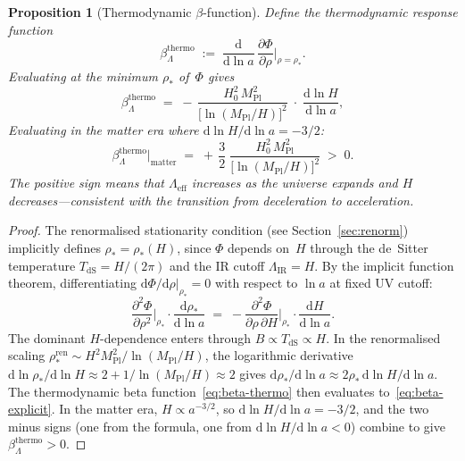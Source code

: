 \documentclass[12pt,a4paper]{article}
\theoremstyle{definition}
\theoremstyle{plain}
\newtheorem{proposition}[definition]{Proposition}
\theoremstyle{remark}
\newcommand{\Leff}{\Lambda_{\mathrm{eff}}}
\newcommand{\LIR}{\Lambda_{\mathrm{IR}}}
\newcommand{\dd}{\mathrm{d}}
\begin{document}
\begin{proposition}[Thermodynamic $\beta$-function]\label{prop:beta-Lambda}
Define the thermodynamic response function
\begin{equation}\label{eq:beta-thermo}
  \beta_\Lambda^{\mathrm{thermo}}
  \;:=\;
  \frac{\dd}{\dd\ln a}\,
  \frac{\partial\Phi}{\partial\rho}\bigg|_{\rho=\rho_\ast}.
\end{equation}
Evaluating at the minimum $\rho_\ast$ of~$\Phi$ gives
\begin{equation}\label{eq:beta-explicit}
  \beta_\Lambda^{\mathrm{thermo}}
  \;=\;
  -\,\frac{H_0^2\,M_{\mathrm{Pl}}^2}{\bigl[\ln(M_{\mathrm{Pl}}/H)\bigr]^2}
  \;\cdot\; \frac{\dd\ln H}{\dd\ln a},
\end{equation}
Evaluating in the matter era where $\dd\ln H/\dd\ln a = -3/2$:
\begin{equation}
  \beta_\Lambda^{\mathrm{thermo}}\Big|_{\mathrm{matter}}
  \;=\;
  +\,\frac{3}{2}\;\frac{H_0^2\,M_{\mathrm{Pl}}^2}
  {\bigl[\ln(M_{\mathrm{Pl}}/H)\bigr]^2}
  \;>\; 0.
\end{equation}
The positive sign means that $\Leff$ increases as the universe
expands and $H$ decreases---consistent with the transition from
deceleration to acceleration.
\end{proposition}

\begin{proof}
The renormalised stationarity condition (see Section~\ref{sec:renorm})
implicitly defines $\rho_\ast = \rho_\ast(H)$, since $\Phi$ depends
on~$H$ through the de~Sitter temperature $T_{\mathrm{dS}} = H/(2\pi)$
and the IR cutoff $\LIR = H$.  By the implicit function theorem,
differentiating $\dd\Phi/\dd\rho\big|_{\rho_\ast} = 0$ with respect
to $\ln a$ at fixed UV cutoff:
\[
  \frac{\partial^2\Phi}{\partial\rho^2}\bigg|_{\rho_\ast}
  \cdot \frac{\dd\rho_\ast}{\dd\ln a}
  \;=\;
  -\frac{\partial^2\Phi}{\partial\rho\,\partial H}
  \bigg|_{\rho_\ast}
  \cdot \frac{\dd H}{\dd\ln a}.
\]
The dominant $H$-dependence enters through $B \propto T_{\mathrm{dS}}
\propto H$.  In the renormalised scaling
$\rho_\ast^{\mathrm{ren}} \sim H^2 M_{\mathrm{Pl}}^2/\ln(M_{\mathrm{Pl}}/H)$,
the logarithmic derivative
$\dd\ln\rho_\ast/\dd\ln H \approx 2 + 1/\ln(M_{\mathrm{Pl}}/H)
\approx 2$ gives
$\dd\rho_\ast/\dd\ln a \approx 2\rho_\ast\,\dd\ln H/\dd\ln a$.
The thermodynamic beta function~\eqref{eq:beta-thermo} then
evaluates to~\eqref{eq:beta-explicit}.
In the matter era, $H \propto a^{-3/2}$, so
$\dd\ln H/\dd\ln a = -3/2$, and the two minus signs (one from the
formula, one from $\dd\ln H/\dd\ln a < 0$) combine to give
$\beta_\Lambda^{\mathrm{thermo}} > 0$.
\end{proof}
\end{document}
